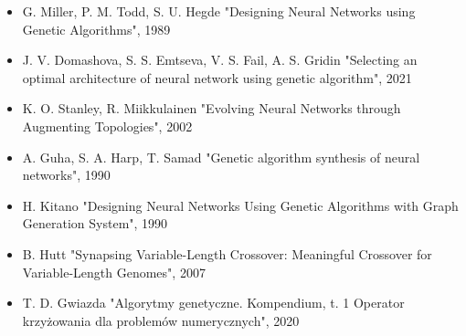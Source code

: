 \documentclass[a4paper, 11pt]{article}
\begin{document}
\begin{itemize}
  \item G. Miller, P. M. Todd, S. U. Hegde "Designing Neural Networks using Genetic Algorithms", 1989
  \item J. V. Domashova, S. S. Emtseva, V. S. Fail, A. S. Gridin "Selecting an optimal architecture of neural network using genetic algorithm", 2021
  \item K. O. Stanley, R. Miikkulainen "Evolving Neural Networks through Augmenting Topologies", 2002
  \item A. Guha, S. A. Harp, T. Samad "Genetic algorithm synthesis of neural networks", 1990
  \item H. Kitano "Designing Neural Networks Using Genetic Algorithms with Graph Generation System", 1990
  \item B. Hutt "Synapsing Variable-Length Crossover: Meaningful Crossover for Variable-Length Genomes", 2007
  \item T. D. Gwiazda "Algorytmy genetyczne. Kompendium, t. 1 Operator krzyżowania dla problemów numerycznych", 2020
\end{itemize}
\end{document}
